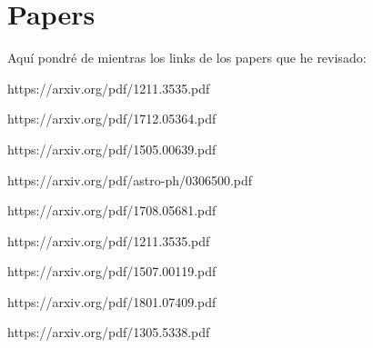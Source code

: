 \documentclass[twocolumn,           %
               showpacs,            %
               preprintnumbers,     %
               aps,                 %
               prl,          	    %
               letterpaper,             %
               superscriptaddress,      %
               nofootinbib,         %
               tightenlines,        %
               floats,floatfix      %
               ,usenatbib,
               ]{revtex4-1}
\begin{document}
\section{Papers} 
Aqu\'i pondré de mientras los links de los papers que he revisado:

https://arxiv.org/pdf/1211.3535.pdf

https://arxiv.org/pdf/1712.05364.pdf

https://arxiv.org/pdf/1505.00639.pdf

https://arxiv.org/pdf/astro-ph/0306500.pdf

https://arxiv.org/pdf/1708.05681.pdf

https://arxiv.org/pdf/1211.3535.pdf

https://arxiv.org/pdf/1507.00119.pdf

https://arxiv.org/pdf/1801.07409.pdf

https://arxiv.org/pdf/1305.5338.pdf
\end{document}
